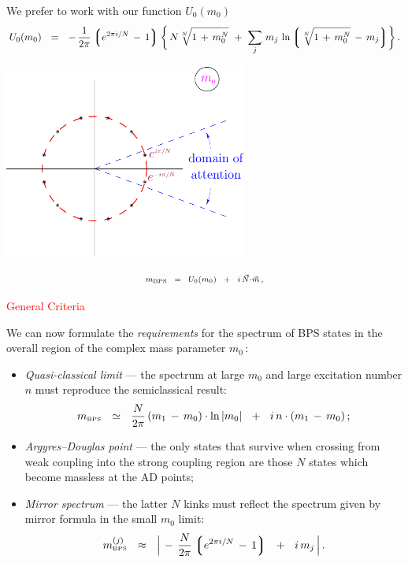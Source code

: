 \documentclass[12pt,letterpaper,landscape,KOMA,smallheadings,calcdimensions,display]{powersem}
\newcommand{\mbps}{m_{\text{\tiny BPS}}}
\begin{document}
\begin{slide}

We prefer to work with our function $ U_0(m_0) $
{\tiny
\[
%
\label{unod}
	U_0 (m_0) ~~=~~ -\, \frac{1}{2\pi} \lgr e^{2\pi i / N} \,-\, 1 \rgr 
	\biggl\{\, N \sqrt[N] { 1 \,+\, m_0^N }  ~+~ 
	\sum_j\, m_j\, \ln  \lgr \sqrt[N] {1 \,+\,  m_0^N } \,-\, m_j \rgr  \biggr\}\,.
\]
}
\begin{center}
\includegraphics[width=8.0cm]{domain.pdf}
\end{center}
\[
\scriptstyle
	\mbps ~~=~~ U_0 (m_0) ~~+~~ i\, \vec{N} \cdot \vec{m}\,,
\]

\end{slide}


\begin{slide}

\centerline{\Large\textcolor{red}{General Criteria}}

\small
	We can now formulate the {\it requirements} for the spectrum of BPS states in the overall
	region of the complex mass parameter $ m_0 \,$:
\begin{itemize}
\item
	\emph{Quasi-classical limit} --- the spectrum at large $ m_0 $ and large excitation number $ n $
	must reproduce the semiclassical result:
\[
\mbps ~~\simeq~~ \frac{N}{2\pi}\,
		( m_1 \,-\, m_0 ) \cdot \ln |m_0 |
	    ~~+~~
	i\, n \cdot ( m_1 \,-\, m_0 )\,;
\]

\item
	\emph{Argyres--Douglas point} --- the only states that survive when crossing from weak coupling 
	into the strong coupling region are those $ N $ states which become massless at the AD points;

\item
	\emph{Mirror spectrum} --- the latter $ N $ kinks must reflect the spectrum given by mirror 
	formula in the small $ m_0 $ limit:
\[
	\mbps^{(j)} ~~\approx~~ \Big|\, -\, \frac{N}{2\pi} \lgr e^{2\pi i / N} \,-\, 1 \rgr 
			   ~~+~~ i\, m_j \,\Big|\,\text.
\]

\end{itemize}


\end{slide}
\end{document}
